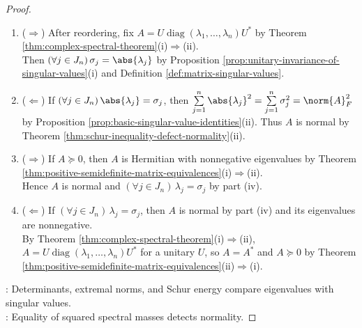 \begin{theorem}
\begin{proof}
\begin{enumerate}[label=(\roman*)]
\item[$(iv)$] ($\Rightarrow$) After reordering, fix $A=U\operatorname{diag}(\lambda_1,\ldots,\lambda_n)U^*$ by Theorem \ref{thm:complex-spectral-theorem}(i)$\Rightarrow$(ii).\\
Then $(\forall j\in J_n)\,\sigma_j=\abs{\lambda_j}$ by Proposition \ref{prop:unitary-invariance-of-singular-values}(i) and Definition \ref{def:matrix-singular-values}.
\item[$(iv)$] ($\Leftarrow$) If $(\forall j\in J_n)\,\abs{\lambda_j}=\sigma_j$, then $\sum\limits_{j=1}^{n}\abs{\lambda_j}^2=\sum\limits_{j=1}^{n}\sigma_j^2=\norm{A}_F^2$ by Proposition \ref{prop:basic-singular-value-identities}(ii). Thus $A$ is normal by Theorem \ref{thm:schur-inequality-defect-normality}(ii).
\item[$(v)$] ($\Rightarrow$) If $A\succeq0$, then $A$ is Hermitian with nonnegative eigenvalues by Theorem \ref{thm:positive-semidefinite-matrix-equivalences}(i)$\Rightarrow$(ii).\\
Hence $A$ is normal and $(\forall j\in J_n)\,\lambda_j=\sigma_j$ by part (iv).
\item[$(v)$] ($\Leftarrow$) If $(\forall j\in J_n)\,\lambda_j=\sigma_j$, then $A$ is normal by part (iv) and its eigenvalues are nonnegative.\\
By Theorem \ref{thm:complex-spectral-theorem}(i)$\Rightarrow$(ii), $A=U\operatorname{diag}(\lambda_1,\ldots,\lambda_n)U^*$ for a unitary $U$, so $A=A^*$ and $A\succeq0$ by Theorem \ref{thm:positive-semidefinite-matrix-equivalences}(ii)$\Rightarrow$(i).
\end{enumerate}
: Determinants, extremal norms, and Schur energy compare eigenvalues with singular values.\\
: Equality of squared spectral masses detects normality.
\end{proof}
\end{theorem}

